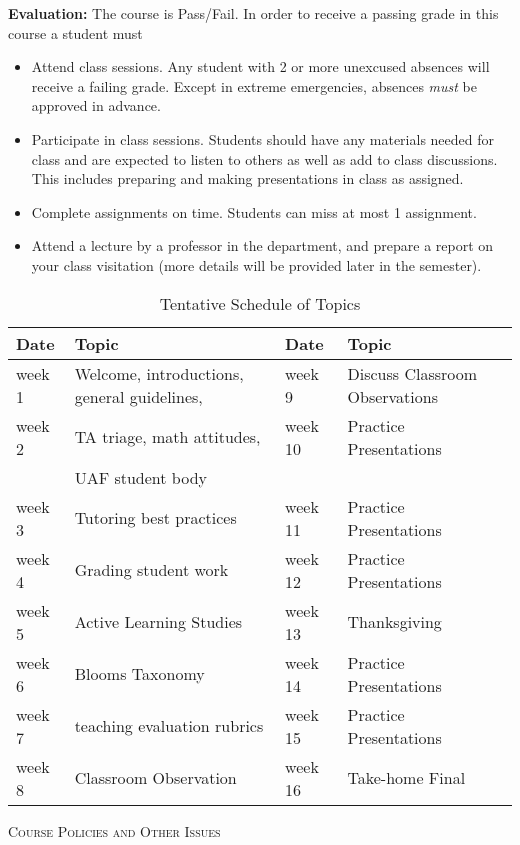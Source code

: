 \documentclass[12pt]{article}
\newcommand\bi{\begin{itemize}}
\newcommand\ei{\end{itemize}}
\begin{document}
\textbf{Evaluation:} The course is Pass/Fail. In order to receive a passing grade in this course a student must
\bi
\item Attend class sessions. Any student with 2 or more unexcused absences will receive a failing grade. Except in extreme emergencies, absences {\em must} be approved in advance. 
\item Participate in class sessions. Students should have any materials needed for class and are expected to listen to others as well as add to class discussions. This includes preparing and making presentations in class as assigned.
\item Complete assignments on time. Students can miss at most 1 assignment.
\item Attend a lecture by a professor in the department, and prepare a report on your class visitation (more details will be provided later in the semester).
\ei
\begin{table}[htp]
\caption*{Tentative Schedule of Topics }
\begin{center}
\begin{tabular}{l |p{2in}||l|p{2in}}
{Date}&{Topic}&{Date}&{Topic}\\
\hline\hline
week 1 & Welcome, introductions, general guidelines,&week 9 &Discuss Classroom Observations \\
week 2 & TA triage, math attitudes, & week 10 & Practice Presentations\\
& UAF student body&&\\
week 3 & Tutoring best practices & week 11 & Practice Presentations \\
week 4 & Grading student work & week 12  & Practice Presentations \\
week 5 & Active Learning Studies& week 13 & Thanksgiving \\
week 6 & Blooms Taxonomy & week 14 & Practice Presentations\\
week 7& teaching evaluation rubrics & week 15&  Practice Presentations \\
week 8 & Classroom Observation& week 16& Take-home Final\\
\end{tabular}
\end{center}
\label{default}
\end{table}%


\textsc{Course Policies and Other Issues}
\end{document}
